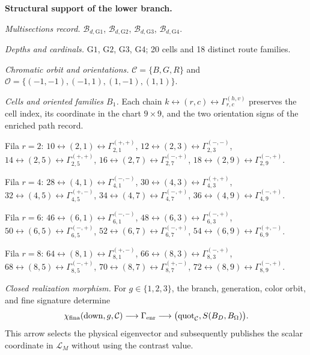 \medskip
{}
\noindent\textbf{Structural support of the lower branch.}\par
\noindent\textit{Multisections record.} \(\mathcal B_{d,\mathrm{G1}}\), \(\mathcal B_{d,\mathrm{G2}}\), \(\mathcal B_{d,\mathrm{G3}}\), \(\mathcal B_{d,\mathrm{G4}}\).\par
\noindent\textit{Depths and cardinals.} $\mathrm{G1}$, $\mathrm{G2}$, $\mathrm{G3}$, $\mathrm{G4}$; 20 cells and 18 distinct route families.\par
\noindent\textit{Chromatic orbit and orientations.} $\mathcal C=\{B,G,R\}$ and $\mathcal O=\{(-1,-1),(-1,1),(1,-1),(1,1)\}$.\par
\noindent\textit{Cells and oriented families $B_1$.} Each chain $k\leftrightarrow(r,c)\leftrightarrow\Gamma_{r,c}^{(h,v)}$ preserves the cell index, its coordinate in the chart $9\times9$, and the two orientation signs of the enriched path record.\par
\noindent Fila $r=2$: $10\leftrightarrow(2,1)\leftrightarrow\Gamma_{2,1}^{(+,+)}$, $12\leftrightarrow(2,3)\leftrightarrow\Gamma_{2,3}^{(-,-)}$, $14\leftrightarrow(2,5)\leftrightarrow\Gamma_{2,5}^{(+,+)}$, $16\leftrightarrow(2,7)\leftrightarrow\Gamma_{2,7}^{(-,+)}$, $18\leftrightarrow(2,9)\leftrightarrow\Gamma_{2,9}^{(-,+)}$.\par
\noindent Fila $r=4$: $28\leftrightarrow(4,1)\leftrightarrow\Gamma_{4,1}^{(-,-)}$, $30\leftrightarrow(4,3)\leftrightarrow\Gamma_{4,3}^{(+,+)}$, $32\leftrightarrow(4,5)\leftrightarrow\Gamma_{4,5}^{(+,-)}$, $34\leftrightarrow(4,7)\leftrightarrow\Gamma_{4,7}^{(-,+)}$, $36\leftrightarrow(4,9)\leftrightarrow\Gamma_{4,9}^{(-,+)}$.\par
\noindent Fila $r=6$: $46\leftrightarrow(6,1)\leftrightarrow\Gamma_{6,1}^{(-,-)}$, $48\leftrightarrow(6,3)\leftrightarrow\Gamma_{6,3}^{(-,+)}$, $50\leftrightarrow(6,5)\leftrightarrow\Gamma_{6,5}^{(-,+)}$, $52\leftrightarrow(6,7)\leftrightarrow\Gamma_{6,7}^{(-,+)}$, $54\leftrightarrow(6,9)\leftrightarrow\Gamma_{6,9}^{(+,-)}$.\par
\noindent Fila $r=8$: $64\leftrightarrow(8,1)\leftrightarrow\Gamma_{8,1}^{(+,-)}$, $66\leftrightarrow(8,3)\leftrightarrow\Gamma_{8,3}^{(-,+)}$, $68\leftrightarrow(8,5)\leftrightarrow\Gamma_{8,5}^{(-,+)}$, $70\leftrightarrow(8,7)\leftrightarrow\Gamma_{8,7}^{(+,-)}$, $72\leftrightarrow(8,9)\leftrightarrow\Gamma_{8,9}^{(-,+)}$.\par
\noindent\textit{Closed realization morphism.} For $g\in\{1,2,3\}$, the branch, generation, color orbit, and fine signature determine
\[\chi_{\rm fina}(\operatorname{down},g,\mathcal C)\longrightarrow\Gamma_{\rm enr}\longrightarrow\bigl(\operatorname{quot}_{\mathcal C},S(B_D,B_\Omega)\bigr).\]
This arrow selects the physical eigenvector and subsequently publishes the scalar coordinate in $\mathcal L_M$ without using the contrast value.\par
\medskip
\endgroup
